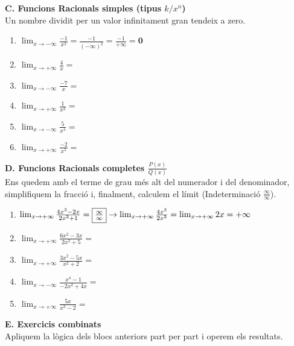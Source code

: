 \documentclass[12pt,a4paper]{article}
\begin{document}
\textbf{C. Funcions Racionals simples (tipus $k/x^n$)} \\
Un nombre dividit per un valor infinitament gran tendeix a zero.

\vspace{-0.2cm}
\begin{enumerate}[label=\textbf{\arabic*.}, resume, itemsep=0.8cm]
    \item $\lim_{x \to -\infty} \frac{-1}{x^2} = \frac{-1}{(-\infty)^2} = \frac{-1}{+\infty} = \mathbf{0}$
    \item $\lim_{x \to +\infty} \frac{4}{x} =$
    \item $\lim_{x \to -\infty} \frac{-7}{x} =$
    \item $\lim_{x \to +\infty} \frac{1}{x^3} =$
    \item $\lim_{x \to -\infty} \frac{5}{x^4} =$
    \item $\lim_{x \to +\infty} \frac{-2}{x^5} =$
\end{enumerate}

\vspace{0.5cm}

\textbf{D. Funcions Racionals completes $\frac{P(x)}{Q(x)}$} \\
Ens quedem amb el terme de grau més alt del numerador i del denominador, simplifiquem la fracció i, finalment, calculem el límit (Indeterminació $\frac{\infty}{\infty}$).

\vspace{-0.2cm}
\begin{enumerate}[label=\textbf{\arabic*.}, resume, itemsep=0.8cm]
    \item $\lim_{x \to +\infty} \frac{4x^3 - 2x}{2x^2 + 1} = \fbox{$\frac{\infty}{\infty}$} \rightarrow \lim_{x \to +\infty} \frac{4x^3}{2x^2} = \lim_{x \to +\infty} 2x = \mathbf{+\infty}$
    \item $\lim_{x \to +\infty} \frac{6x^2 - 3x}{2x^2 + 5} = $
    \item $\lim_{x \to +\infty} \frac{3x^2 - 5x}{x^2 + 2} =$
    \item $\lim_{x \to -\infty} \frac{x^4 - 1}{-2x^2 + 4x} =$
    \item $\lim_{x \to +\infty} \frac{5x}{x^3 - 2} =$
\end{enumerate}
\newpage
\vspace{0.5cm}

\textbf{E. Exercicis combinats} \\
Apliquem la lògica dels blocs anteriors part per part i operem els resultats.
\end{document}
